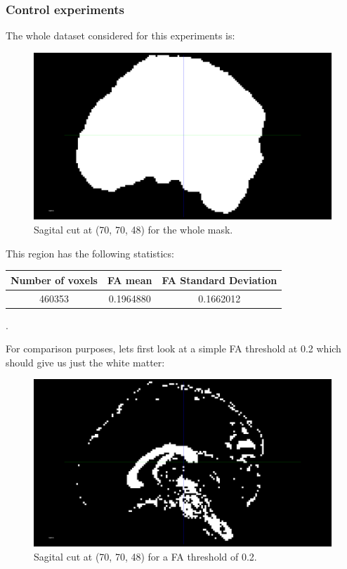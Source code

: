 \documentclass[a4paper,11pt]{report}
\begin{document}
      \subsubsection{Control experiments}
      The whole dataset considered for this experiments is:

      \begin{figure}[H]
        \includegraphics[width=1\linewidth]{imgs/whole.png}
        \caption{Sagital cut at (70, 70, 48) for the whole mask.}
        \label{fig:whole}
      \end{figure}

      This region has the following statistics:

      \begin{tabular}{| c | c | c |}
        \hline
        Number of voxels & FA mean & FA Standard Deviation \\ \hline
        460353 & 0.1964880 & 0.1662012 \\ \hline
      \end{tabular}

      .\newline

      For comparison purposes, lets first look at a simple FA threshold at 0.2 which should give us just the white matter:

      \begin{figure}[H]
        \includegraphics[width=1\linewidth]{imgs/fa_02threshold.png}
        \caption{Sagital cut at (70, 70, 48) for a FA threshold of 0.2.}
        \label{fig:fa_threshold}
      \end{figure}
\end{document}
